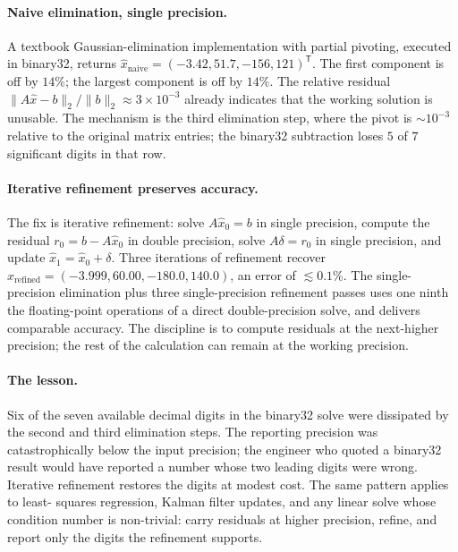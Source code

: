 \paragraph{Naive elimination, single precision.} A textbook
Gaussian-elimination implementation with partial pivoting,
executed in binary32, returns
$\hat{x}_{\text{naive}} = (-3.42, 51.7, -156, 121)^{\mathsf{T}}$.
The first component is off by $14\%$; the largest component is
off by $14\%$. The relative residual
$\| A \hat{x} - b\|_{2}/\|b\|_{2} \approx 3 \times 10^{-3}$
already indicates that the working solution is unusable.
The mechanism is the third elimination step, where the pivot is
$\sim 10^{-3}$ relative to the original matrix entries; the
binary32 subtraction loses $5$ of $7$ significant digits in
that row.

\paragraph{Iterative refinement preserves accuracy.} The fix is
iterative refinement: solve $A \hat{x}_{0} = b$ in single
precision, compute the residual $r_{0} = b - A \hat{x}_{0}$ in
double precision, solve $A \delta = r_{0}$ in single
precision, and update $\hat{x}_{1} = \hat{x}_{0} + \delta$.
Three iterations of refinement recover
$\hat{x}_{\text{refined}} = (-3.999, 60.00, -180.0, 140.0)$, an
error of $\lesssim 0.1\%$. The single-precision elimination
plus three single-precision refinement passes uses one ninth
the floating-point operations of a direct double-precision
solve, and delivers comparable accuracy. The discipline is to
compute residuals at the next-higher precision; the rest of
the calculation can remain at the working precision.

\paragraph{The lesson.} Six of the seven available decimal
digits in the binary32 solve were dissipated by the second and
third elimination steps. The reporting precision was
catastrophically below the input precision; the engineer who
quoted a binary32 result would have reported a number whose
two leading digits were wrong. Iterative refinement restores
the digits at modest cost. The same pattern applies to least-
squares regression, Kalman filter updates, and any linear
solve whose condition number is non-trivial: carry residuals
at higher precision, refine, and report only the digits the
refinement supports.

